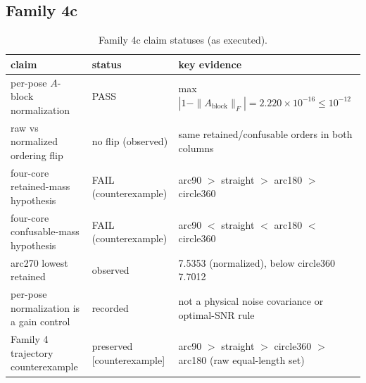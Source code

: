 \documentclass[12pt]{article}
\newcommand{\CTX}{\textnormal{[counterexample]}}
\begin{document}
\subsection{Family 4c}
\begin{table}[ht]
\centering
\small
\caption{Family 4c claim statuses (as executed).}
\label{app:tab:f4c}
\begin{tabular}{p{} p{} p{}}
\toprule
claim & status & key evidence \\
\midrule
per-pose $A$-block normalization & PASS &
max $|1-\|A_{\mathrm{block}}\|_F|=2.220\times10^{-16}\le10^{-12}$ \\
raw vs normalized ordering flip & no flip (observed) &
same retained/confusable orders in both columns \\
four-core retained-mass hypothesis & FAIL (counterexample) &
arc90 $>$ straight $>$ arc180 $>$ circle360 \\
four-core confusable-mass hypothesis & FAIL (counterexample) &
arc90 $<$ straight $<$ arc180 $<$ circle360 \\
arc270 lowest retained & observed & 7.5353 (normalized),
below circle360 7.7012 \\
per-pose normalization is a gain control & recorded &
not a physical noise covariance or optimal-SNR rule \\
Family 4 trajectory counterexample & preserved \CTX{} &
arc90 $>$ straight $>$ circle360 $>$ arc180 (raw equal-length set) \\
\bottomrule
\end{tabular}
\end{table}
\end{document}
